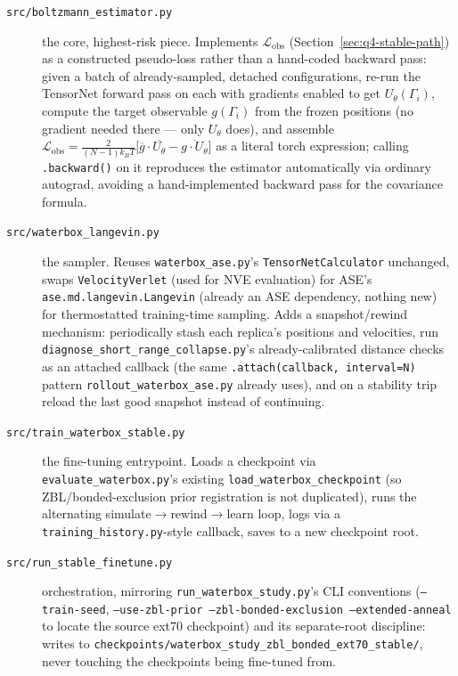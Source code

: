 \documentclass[11pt]{article}
\begin{document}
\begin{description}
  \item[\texttt{src/boltzmann\_estimator.py}] the core, highest-risk piece.
  Implements $\mathcal{L}_{\text{obs}}$ (Section~\ref{sec:q4-stable-path})
  as a constructed pseudo-loss rather than a hand-coded backward pass: given
  a batch of already-sampled, detached configurations, re-run the TensorNet
  forward pass on each with gradients enabled to get $U_\theta(\Gamma_i)$,
  compute the target observable $g(\Gamma_i)$ from the frozen positions (no
  gradient needed there --- only $U_\theta$ does), and assemble
  $\mathcal{L}_{\text{obs}}=\frac{2}{(N-1)k_BT}\big[\overline{g}\cdot
  \overline{U_\theta}-\overline{g\cdot U_\theta}\big]$ as a literal torch
  expression; calling \texttt{.backward()} on it reproduces the estimator
  automatically via ordinary autograd, avoiding a hand-implemented backward
  pass for the covariance formula.
  \item[\texttt{src/waterbox\_langevin.py}] the sampler. Reuses
  \texttt{waterbox\_ase.py}'s \texttt{TensorNetCalculator} unchanged, swaps
  \texttt{VelocityVerlet} (used for NVE evaluation) for ASE's
  \texttt{ase.md.langevin.Langevin} (already an ASE dependency, nothing new)
  for thermostatted training-time sampling. Adds a snapshot/rewind
  mechanism: periodically stash each replica's positions and velocities,
  run \texttt{diagnose\_short\_range\_collapse.py}'s already-calibrated
  distance checks as an attached callback (the same
  \texttt{.attach(callback, interval=N)} pattern
  \texttt{rollout\_waterbox\_ase.py} already uses), and on a stability trip
  reload the last good snapshot instead of continuing.
  \item[\texttt{src/train\_waterbox\_stable.py}] the fine-tuning
  entrypoint. Loads a checkpoint via \texttt{evaluate\_waterbox.py}'s
  existing \texttt{load\_waterbox\_checkpoint} (so ZBL/bonded-exclusion
  prior registration is not duplicated), runs the alternating
  simulate$\to$rewind$\to$learn loop, logs via a
  \texttt{training\_history.py}-style callback, saves to a new checkpoint
  root.
  \item[\texttt{src/run\_stable\_finetune.py}] orchestration, mirroring
  \texttt{run\_waterbox\_study.py}'s CLI conventions
  (\texttt{--train-seed}, \texttt{--use-zbl-prior --zbl-bonded-exclusion
  --extended-anneal} to locate the source ext70 checkpoint) and its
  separate-root discipline: writes to
  \texttt{checkpoints/waterbox\_study\_zbl\_bonded\_ext70\_stable/}, never
  touching the checkpoints being fine-tuned from.
\end{description}
\end{document}
